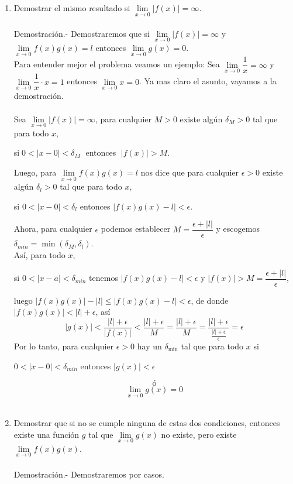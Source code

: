 \begin{enumerate}
\begin{enumerate}[\bfseries (a)]
    \item Demostrar el mismo resultado si $\lim\limits_{x\to 0} |f(x)| = \infty$.\\\\
	Demostración.-\; Demostraremos que si $\lim\limits_{x\to 0}|f(x)|=\infty$ y $\lim\limits_{x\to 0}f(x)g(x)=l$ entonces $\lim\limits_{x\to 0}g(x)=0$.\\
	Para entender mejor el problema veamos un ejemplo: Sea $\lim\limits_{x\to 0}\dfrac{1}{x}=\infty$ y $\lim\limits_{x\to 0}\dfrac{1}{x}\cdot x=1$ entonces $\lim\limits_{x\to 0} x = 0$. Ya mas claro el asunto, vayamos a la demostración.\\\\
	Sea $\lim\limits_{x\to 0} |f(x)|=\infty$, para cualquier $M>0$ existe algún $\delta_M >0$ tal que para todo $x$, \begin{center}  si$\; 0<|x-0|<\delta_M\;$ entonces $\;|f(x)|>M.$ \end{center}
	Luego, para $\lim\limits_{x\to 0} f(x)g(x)=l$  nos dice que para cualquier $\epsilon>0$ existe algún $\delta_l>0$ tal que para todo $x$,
	\begin{center}
	si $0<|x-0|<\delta_l$ entonces $|f(x)g(x)-l|<\epsilon$.\\
	\end{center}
	Ahora, para cualquier $\epsilon$ podemos establecer $M=\dfrac{\epsilon+|l|}{\epsilon}$ y escogemos $\delta_{min} = \min(\delta_M,\delta_l)$.\\
	Así, para todo $x$, \begin{center} si $0<|x-a|<\delta_{min}$ tenemos $|f(x)g(x)-l|<\epsilon$ y $|f(x)|>M=\dfrac{\epsilon+|l|}{\epsilon}$, \end{center} luego $|f(x)g(x)|-|l|\leq |f(x)g(x)-l|<\epsilon$, de donde $|f(x)g(x)|<|l|+\epsilon$, así $$|g(x)|<\dfrac{|l|+\epsilon}{|f(x)|}<\dfrac{|l|+\epsilon}{M}=\dfrac{|l|+\epsilon}{M} = \dfrac{|l|+\epsilon}{\frac{|l|+\epsilon}{\epsilon}}=\epsilon$$
	Por lo tanto, para cualquier $\epsilon>0$ hay un $\delta_{\min}$ tal que para todo $x$ si \begin{center} $0<|x-0|<\delta_{min}$ entonces $|g(x)|<\epsilon$ \end{center} $$ó$$ $$\lim_{x\to 0}g(x)=0$$\\

    \item Demostrar que si no se cumple ninguna de estas dos condiciones, entonces existe una función $g$ tal que $\lim\limits_{x\to 0}g(x)$ no existe, pero existe $\lim\limits_{x\to 0}f(x)g(x)$.\\\\
	Demostración.-\; Demostraremos por casos.
	\begin{enumerate}


\end{enumerate}
\end{enumerate}
\end{enumerate}
